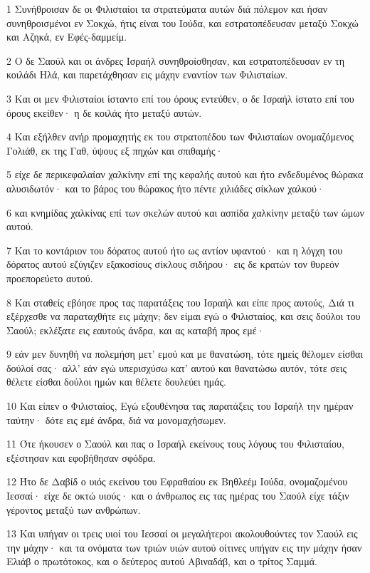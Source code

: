 \par 1 Συνήθροισαν δε οι Φιλισταίοι τα στρατεύματα αυτών διά πόλεμον και ήσαν συνηθροισμένοι εν Σοκχώ, ήτις είναι του Ιούδα, και εστρατοπέδευσαν μεταξύ Σοκχώ και Αζηκά, εν Εφές-δαμμείμ.
\par 2 Ο δε Σαούλ και οι άνδρες Ισραήλ συνηθροίσθησαν, και εστρατοπέδευσαν εν τη κοιλάδι Ηλά, και παρετάχθησαν εις μάχην εναντίον των Φιλισταίων.
\par 3 Και οι μεν Φιλισταίοι ίσταντο επί του όρους εντεύθεν, ο δε Ισραήλ ίστατο επί του όρους εκείθεν· η δε κοιλάς ήτο μεταξύ αυτών.
\par 4 Και εξήλθεν ανήρ προμαχητής εκ του στρατοπέδου των Φιλισταίων ονομαζόμενος Γολιάθ, εκ της Γαθ, ύψους εξ πηχών και σπιθαμής·
\par 5 είχε δε περικεφαλαίαν χαλκίνην επί της κεφαλής αυτού και ήτο ενδεδυμένος θώρακα αλυσιδωτόν· και το βάρος του θώρακος ήτο πέντε χιλιάδες σίκλων χαλκού·
\par 6 και κνημίδας χαλκίνας επί των σκελών αυτού και ασπίδα χαλκίνην μεταξύ των ώμων αυτού.
\par 7 Και το κοντάριον του δόρατος αυτού ήτο ως αντίον υφαντού· και η λόγχη του δόρατος αυτού εζύγιζεν εξακοσίους σίκλους σιδήρου· εις δε κρατών τον θυρεόν προεπορεύετο αυτού.
\par 8 Και σταθείς εβόησε προς τας παρατάξεις του Ισραήλ και είπε προς αυτούς, Διά τι εξέρχεσθε να παραταχθήτε εις μάχην; δεν είμαι εγώ ο Φιλισταίος, και σεις δούλοι του Σαούλ; εκλέξατε εις εαυτούς άνδρα, και ας καταβή προς εμέ·
\par 9 εάν μεν δυνηθή να πολεμήση μετ' εμού και με θανατώση, τότε ημείς θέλομεν είσθαι δούλοί σας· αλλ' εάν εγώ υπερισχύσω κατ' αυτού και θανατώσω αυτόν, τότε σεις θέλετε είσθαι δούλοι ημών και θέλετε δουλεύει ημάς.
\par 10 Και είπεν ο Φιλισταίος, Εγώ εξουθένησα τας παρατάξεις του Ισραήλ την ημέραν ταύτην· δότε εις εμέ άνδρα, διά να μονομαχήσωμεν.
\par 11 Ότε ήκουσεν ο Σαούλ και πας ο Ισραήλ εκείνους τους λόγους του Φιλισταίου, εξέστησαν και εφοβήθησαν σφόδρα.
\par 12 Ήτο δε Δαβίδ ο υιός εκείνου του Εφραθαίου εκ Βηθλεέμ Ιούδα, ονομαζομένου Ιεσσαί· είχε δε οκτώ υιούς· και ο άνθρωπος εις τας ημέρας του Σαούλ είχε τάξιν γέροντος μεταξύ των ανθρώπων.
\par 13 Και υπήγαν οι τρεις υιοί του Ιεσσαί οι μεγαλήτεροι ακολουθούντες τον Σαούλ εις την μάχην· και τα ονόματα των τριών υιών αυτού οίτινες υπήγαν εις την μάχην ήσαν Ελιάβ ο πρωτότοκος, και ο δεύτερος αυτού Αβιναδάβ, και ο τρίτος Σαμμά.
